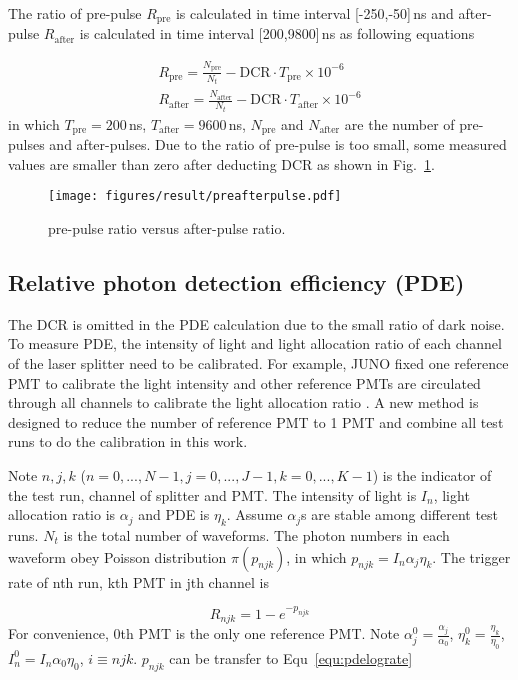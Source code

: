 The ratio of pre-pulse $R_{\mathrm{pre}}$ is calculated in time interval [-250,-50]\,ns and after-pulse $R_{\mathrm{after}}$ is calculated in time interval [200,9800]\,ns as following equations

\begin{align}
    R_{\mathrm{pre}} = \frac{N_{\mathrm{pre}}}{N_t} - \mathrm{DCR}\cdot T_{\mathrm{pre}}\times10^{-6}\\
    R_{\mathrm{after}} = \frac{N_{\mathrm{after}}}{N_t} - \mathrm{DCR}\cdot T_{\mathrm{after}}\times10^{-6}
\end{align}
in which $T_{\mathrm{pre}}=200$\,ns, $T_{\mathrm{after}}=9600$\,ns, $N_{\mathrm{pre}}$ and $N_{\mathrm{after}}$ are the number of pre-pulses and after-pulses. Due to the ratio of pre-pulse is too small, some measured values are smaller than zero after deducting DCR as shown in Fig.~\ref{fig:prepulseCompare}.

\begin{figure}[!htbp]
    \centering
    \texttt{[image: figures/result/preafterpulse.pdf]}
    \caption{pre-pulse ratio versus after-pulse ratio.}
    \label{fig:prepulseCompare}
\end{figure}

\subsection{Relative photon detection efficiency (PDE)}
The DCR is omitted in the PDE calculation due to the small ratio of dark noise. To measure PDE, the intensity of light and light allocation ratio of each channel of the laser splitter need to be calibrated. For example, JUNO fixed one reference PMT to calibrate the light intensity and other reference PMTs are circulated through all channels to calibrate the light allocation ratio \cite{Wonsak_2021}. A new method is designed to reduce the number of reference PMT to 1 PMT and combine all test runs to do the calibration in this work.

Note $n,j,k$ ($n=0,...,N-1, j=0,...,J-1, k=0,...,K-1$) is the indicator of the test run, channel of splitter and PMT. The intensity of light is $I_n$, light allocation ratio is $\alpha_j$ and PDE is $\eta_k$. Assume $\alpha_j$s are stable among different test runs. $N_t$ is the total number of waveforms. The photon numbers in each waveform obey Poisson distribution $\pi(p_{njk})$, in which $p_{njk}=I_n\alpha_j\eta_k$. The trigger rate of nth run, kth PMT in jth channel is

\begin{equation}
    \label{equ:pderate}
    R_{njk}=1-e^{-p_{njk}}
\end{equation}
For convenience, 0th PMT is the only one reference PMT. Note $\alpha_j^0=\frac{\alpha_j}{\alpha_0}$, $\eta_k^0=\frac{\eta_k}{\eta_0}$, $I_n^0=I_n\alpha_0\eta_0$, $i\equiv njk$. $p_{njk}$ can be transfer to Equ~\eqref{equ:pdelograte}

